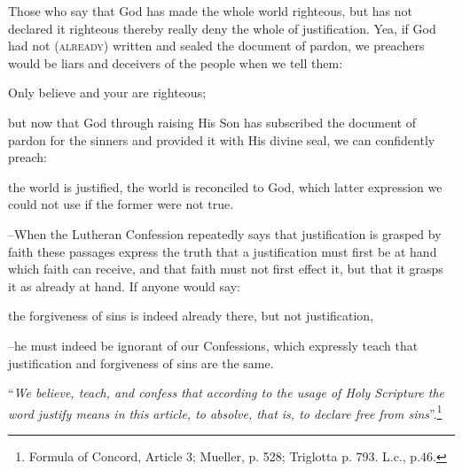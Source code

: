                 Those who say that God has made the whole world righteous, but has not declared it righteous thereby really deny the whole of justification.  Yea, if God had not {\scriptsize\textsc{(already)}} written and sealed the document of pardon, we preachers would be liars and deceivers of the people when we tell them: \begin{displayquote}{\footnotesize Only believe and your are righteous;}\end{displayquote}  but now that God through raising His Son has subscribed the document of pardon for the sinners and provided it with His divine seal, we can confidently preach:\begin{displayquote}{\footnotesize the world is justified, the world is reconciled to God, which latter expression we could not use if the former were not true.}\end{displayquote} –When the Lutheran Confession repeatedly says that justification is grasped by faith these passages express the truth that a justification must first be at hand which faith can receive, and that faith must not first effect it, but that it grasps it as already at hand.  If anyone would say: \begin{displayquote}{\footnotesize the forgiveness of sins is indeed already there, but not justification,}\end{displayquote} --he must indeed be ignorant of our Confessions, which expressly teach that justification and forgiveness of sins are the same.  \begin{displayquote}“\textit{We believe, teach, and confess that according to the usage of Holy Scripture the word justify means in this article, to absolve, that is, to declare free from sins}”.\footnote{Formula of Concord, Article 3; Mueller, p. 528; Triglotta p. 793. L.c., p.46.}\end{displayquote}

